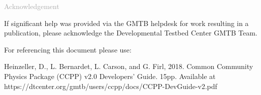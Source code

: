 \begin{titlepage}
\vspace*{0.5cm}
\noindent

\begin{flushleft}
\textcolor{darkgray}{\LARGE Acknowledgement}
\vspace*{1cm}\par

If significant help was provided via the GMTB helpdesk for work resulting in a publication, please acknowledge the Developmental Testbed Center GMTB Team.\\
\vspace*{1cm}\par
For referencing this document please use:\\ 
\vspace*{1cm}\par
Heinzeller, D., L. Bernardet, L. Carson, and G. Firl, 2018. Common Community Physics Package (CCPP) v2.0 Developers' Guide. 15pp. Available at https://dtcenter.org/gmtb/users/ccpp/docs/CCPP-DevGuide-v2.pdf

\end{flushleft}
\end{titlepage}
\pagebreak{}




